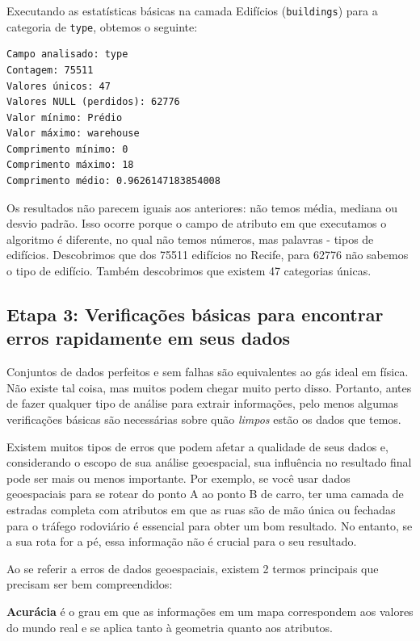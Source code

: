 \documentclass[
]{krantz}
\begin{document}
Executando as estatísticas básicas na camada Edifícios (\texttt{buildings}) para a categoria de \texttt{type}, obtemos o seguinte:

\begin{verbatim}
Campo analisado: type
Contagem: 75511
Valores únicos: 47
Valores NULL (perdidos): 62776
Valor mínimo: Prédio
Valor máximo: warehouse
Comprimento mínimo: 0
Comprimento máximo: 18
Comprimento médio: 0.9626147183854008
\end{verbatim}

Os resultados não parecem iguais aos anteriores: não temos média, mediana ou desvio padrão. Isso ocorre porque o campo de atributo em que executamos o algoritmo é diferente, no qual não temos números, mas palavras - tipos de edifícios. Descobrimos que dos 75511 edifícios no Recife, para 62776 não sabemos o tipo de edifício. Também descobrimos que existem 47 categorias únicas.

\hypertarget{etapa-3-verificauxe7uxf5es-buxe1sicas-para-encontrar-erros-rapidamente-em-seus-dados}{%
\subsection{Etapa 3: Verificações básicas para encontrar erros rapidamente em seus dados}\label{etapa-3-verificauxe7uxf5es-buxe1sicas-para-encontrar-erros-rapidamente-em-seus-dados}}

Conjuntos de dados perfeitos e sem falhas são equivalentes ao gás ideal em física. Não existe tal coisa, mas muitos podem chegar muito perto disso. Portanto, antes de fazer qualquer tipo de análise para extrair informações, pelo menos algumas verificações básicas são necessárias sobre quão \emph{limpos} estão os dados que temos.

Existem muitos tipos de erros que podem afetar a qualidade de seus dados e, considerando o escopo de sua análise geoespacial, sua influência no resultado final pode ser mais ou menos importante. Por exemplo, se você usar dados geoespaciais para se rotear do ponto A ao ponto B de carro, ter uma camada de estradas completa com atributos em que as ruas são de mão única ou fechadas para o tráfego rodoviário é essencial para obter um bom resultado. No entanto, se a sua rota for a pé, essa informação não é crucial para o seu resultado.

Ao se referir a erros de dados geoespaciais, existem 2 termos principais que precisam ser bem compreendidos:

\textbf{Acurácia} é o grau em que as informações em um mapa correspondem aos valores do mundo real e se aplica tanto à geometria quanto aos atributos.
\end{document}
